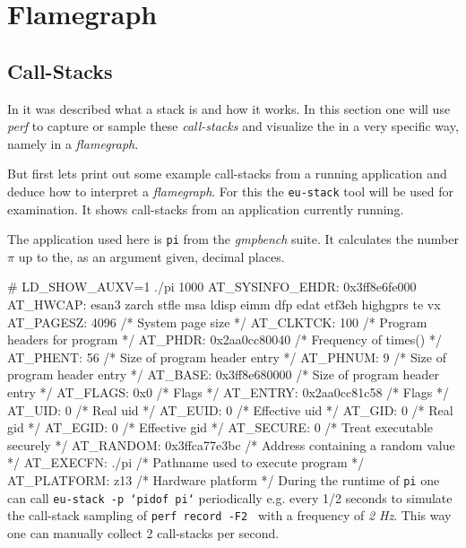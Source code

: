 \chapter[fgraph]{Flamegraph}
\section{Call-Stacks}

In \in[framep] \about[framep] it was described what a stack is and how
it works.  In this section one will use {\em perf} to capture or
sample these {\em call-stacks} and visualize the in a very specific
way, namely in a {\em flamegraph}.

But first lets print out some example call-stacks from a running
application and deduce how to interpret a {\em flamegraph}. For this
the {\tt eu-stack} tool will be
used for examination. It shows call-stacks from an application
currently running.

The application used here is {\tt pi} from the {\em gmpbench} suite. It
calculates the number $\pi$ up to the, as an argument given, decimal places.

\starttyping
#  LD_SHOW_AUXV=1 ./pi 1000
AT_SYSINFO_EHDR: 0x3ff8e6fe000
AT_HWCAP:    esan3 zarch stfle msa ldisp eimm dfp edat etf3eh highgprs te vx
AT_PAGESZ:       4096          /* System page size                  */
AT_CLKTCK:       100           /* Program headers for program       */
AT_PHDR:         0x2aa0cc80040 /* Frequency of times()              */
AT_PHENT:        56            /* Size of program header entry      */
AT_PHNUM:        9             /* Size of program header entry      */
AT_BASE:         0x3ff8e680000 /* Size of program header entry      */
AT_FLAGS:        0x0           /* Flags                             */
AT_ENTRY:        0x2aa0cc81c58 /* Flags                             */
AT_UID:          0             /* Real uid                          */
AT_EUID:         0             /* Effective uid                     */
AT_GID:          0             /* Real gid                          */
AT_EGID:         0             /* Effective gid                     */
AT_SECURE:       0             /* Treat executable securely         */
AT_RANDOM:       0x3ffca77e3bc /* Address containing a random value */
AT_EXECFN:       ./pi          /* Pathname used to execute program  */
AT_PLATFORM:     z13           /* Hardware platform                 */
\stoptyping
%
During the runtime of {\tt pi} one can call {\tt eu-stack -p `pidof
  pi`} periodically e.g. every 1/2 seconds to simulate the call-stack
sampling of {\tt perf record -F2 } with a frequency of {\em 2 Hz}. This way
one can manually collect 2 call-stacks per second.

